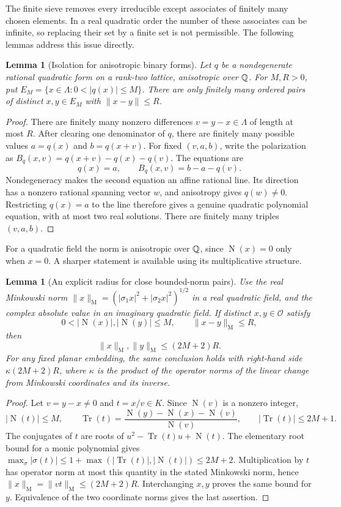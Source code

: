 \documentclass[11pt]{article}
\numberwithin{equation}{section}
\newtheorem{lemma}[theorem]{Lemma}
\theoremstyle{definition}\newtheorem{definition}[theorem]{Definition}
\theoremstyle{remark}\newtheorem{remark}[theorem]{Remark}
\newcommand{\OO}{\mathcal O}\newcommand{\PP}{\mathcal P}
\newcommand{\norm}[1]{\lVert #1\rVert}
\newcommand{\abs}[1]{\lvert #1\rvert}
\newcommand{\set}[1]{\{#1\}}
\newcommand{\N}{\operatorname{N}}
\newcommand{\Tr}{\operatorname{Tr}}
\begin{document}
The finite sieve removes every irreducible except associates of finitely many chosen elements. In a real quadratic order the number of these associates can be infinite, so replacing their set by a finite set is not permissible. The following lemmas address this issue directly.

\begin{lemma}[Isolation for anisotropic binary forms]\label{lem:conic}
Let $q$ be a nondegenerate rational quadratic form on a rank-two lattice, anisotropic over $\mathbb Q$. For $M,R>0$, put
$E_M=\set{x\in\Lambda:0<\abs{q(x)}\le M}$. There are only finitely many ordered pairs of distinct $x,y\in E_M$ with $\norm{x-y}\le R$.
\end{lemma}
\begin{proof}
There are finitely many nonzero differences $v=y-x\in\Lambda$ of length at most $R$. After clearing one denominator of $q$, there are finitely many possible values $a=q(x)$ and $b=q(x+v)$. For fixed $(v,a,b)$, write the polarization as $B_q(x,v)=q(x+v)-q(x)-q(v)$. The equations are
\[
 q(x)=a,\qquad B_q(x,v)=b-a-q(v).
\]
Nondegeneracy makes the second equation an affine rational line. Its direction has a nonzero rational spanning vector $w$, and anisotropy gives $q(w)\ne0$. Restricting $q(x)=a$ to the line therefore gives a genuine quadratic polynomial equation, with at most two real solutions. There are finitely many triples $(v,a,b)$.
\end{proof}

For a quadratic field the norm is anisotropic over $\mathbb Q$, since $\N(x)=0$ only when $x=0$. A sharper statement is available using its multiplicative structure.

\begin{lemma}[An explicit radius for close bounded-norm pairs]\label{lem:radius}
Use the real Minkowski norm $\norm x_{\mathrm M}=(\abs{\sigma_1x}^2+\abs{\sigma_2x}^2)^{1/2}$ in a real quadratic field, and the complex absolute value in an imaginary quadratic field. If distinct $x,y\in\OO$ satisfy
\[
 0<\abs{\N(x)},\abs{\N(y)}\le M,\qquad
 \norm{x-y}_{\mathrm M}\le R,
\]
then
\[
 \norm x_{\mathrm M},\norm y_{\mathrm M}\le(2M+2)R.
\]
For any fixed planar embedding, the same conclusion holds with right-hand side $\kappa(2M+2)R$, where $\kappa$ is the product of the operator norms of the linear change from Minkowski coordinates and its inverse.
\end{lemma}
\begin{proof}
Let $v=y-x\ne0$ and $t=x/v\in K$. Since $\N(v)$ is a nonzero integer,
\[
 \abs{\N(t)}\le M,
 \qquad
 \Tr(t)=\frac{\N(y)-\N(x)-\N(v)}{\N(v)},
 \qquad \abs{\Tr(t)}\le2M+1.
\]
The conjugates of $t$ are roots of $u^2-\Tr(t)u+\N(t)$. The elementary root bound for a monic polynomial gives
$\max_\sigma\abs{\sigma(t)}\le1+\max(\abs{\Tr(t)},\abs{\N(t)})\le2M+2$.
Multiplication by $t$ has operator norm at most this quantity in the stated Minkowski norm, hence $\norm x_{\mathrm M}=\norm{vt}_{\mathrm M}\le(2M+2)R$. Interchanging $x,y$ proves the same bound for $y$. Equivalence of the two coordinate norms gives the last assertion.
\end{proof}
\end{document}

